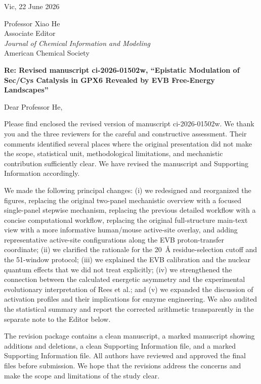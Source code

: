 \documentclass[11pt]{article}
\begin{document}
\begin{flushright}
Vic, 22 June 2026
\end{flushright}

Professor Xiao He\\
Associate Editor\\
\textit{Journal of Chemical Information and Modeling}\\
American Chemical Society

\textbf{Re: Revised manuscript ci-2026-01502w, ``Epistatic Modulation of Sec/Cys
Catalysis in GPX6 Revealed by EVB Free-Energy Landscapes''}

Dear Professor He,

Please find enclosed the revised version of manuscript ci-2026-01502w. We thank you
and the three reviewers for the careful and constructive assessment. Their comments
identified several places where the original presentation did not make the scope,
statistical unit, methodological limitations, and mechanistic contribution sufficiently
clear. We have revised the manuscript and Supporting Information accordingly.

We made the following principal changes: (i) we redesigned and reorganized the figures,
replacing the original two-panel mechanistic overview with a focused single-panel stepwise
mechanism, replacing the previous detailed workflow with a concise computational workflow,
replacing the original full-structure main-text view with a more informative human/mouse
active-site overlay, and adding representative active-site configurations along the EVB
proton-transfer coordinate; (ii) we clarified the rationale for the 20~\AA{}
residue-selection cutoff and the 51-window protocol; (iii) we explained the EVB calibration
and the nuclear quantum effects that we did not treat explicitly; (iv) we strengthened the
connection between the calculated energetic asymmetry and the experimental evolutionary
interpretation of Rees et al.; and (v) we expanded the discussion of activation profiles and
their implications for enzyme engineering. We also audited the statistical summary and report
the corrected arithmetic transparently in the separate note to the Editor below.

The revision package contains a clean manuscript, a marked manuscript showing additions
and deletions, a clean Supporting Information file, and a marked Supporting Information
file. All authors have reviewed and approved the final files before submission. We hope that
the revisions address the concerns and make the scope and limitations of the study clear.
\end{document}
